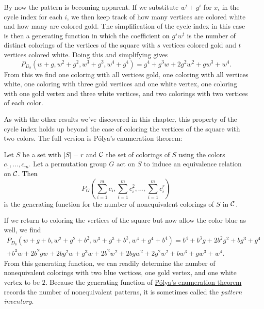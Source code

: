 By now the pattern is becoming apparent. If we substitute $w^i+g^i$
for $x_i$ in the cycle index for each $i$, we then keep track of how
many vertices are colored white and how many are colored gold. The
simplification of the cycle index in this case is then a generating
function in which the coefficient on $g^s w^t$ is the number of
distinct colorings of the vertices of the square with $s$ vertices
colored gold and $t$ vertices colored white. Doing this and
simplifying gives
\[P_{D_8}(w+g,w^2+g^2,w^3+g^3,w^4+g^4) = g^4+g^3 w+2 g^2 w^2+g
w^3+w^4.\]
From this we find one coloring with all vertices gold,
one coloring with all vertices white, one coloring with three gold
vertices and one white vertex, one coloring with one gold vertex and
three white vertices, and two colorings with two vertices of each
color.

As with the other results we've discovered in this chapter, this
property of the cycle index holds up beyond the case of coloring the
vertices of the square with two colors. The full version is P\'olya's
enumeration theorem:

\begin{theorem}\label{theorem:polya:polya}
  Let $S$ be a set with $|S|=r$ and $\mathcal{C}$ the set of colorings of $S$
  using the colors $c_1,\dots,c_m$. Let a permutation group $G$ act on
  $S$ to induce an equivalence relation on $\mathcal{C}$. Then
  \[P_G\left(\sum_{i=1}^m c_i, \sum_{i=1}^m c_i^2, \dots,\sum_{i=1}^m
    c_i^r\right) \]
  is the generating function for the number of nonequivalent colorings
  of $S$ in $\mathcal{C}$.
\end{theorem}

If we return to coloring the vertices of the square but now allow the
color blue as well, we find
\begin{multline*}P_{D_8}(w+g+b,w^2+g^2+b^2,w^3+g^3+b^3,w^4+g^4+b^4) = b^4+b^3 g+2 b^2 g^2+b g^3+g^4\\+b^3 w+2 b^2 g w+2 b g^2 w+g^3 w+2 b^2 w^2+2 b g w^2+2 g^2 w^2+b w^3+g w^3+w^4.\end{multline*}
From this generating function, we can readily determine the number of
nonequivalent colorings with two blue vertices, one gold vertex, and
one white vertex to be $2$. Because the generating function of
\hyperref[theorem:polya:polya]{P\'olya's enumeration theorem} records
the number of nonequivalent patterns, it is sometimes called the
\emph{pattern inventory}. 

